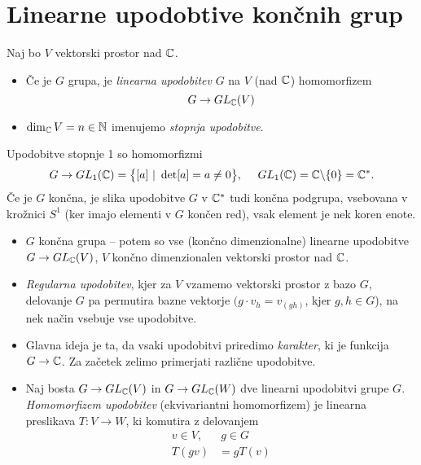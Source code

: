 \section{Linearne upodobtive kon\v cnih grup}

\begin{defin}
	Naj bo $V$ vektorski prostor nad $\mathbb{C}$.
	\begin{itemize}
		\item{\v Ce je $G$ grupa, je {\em linearna upodobitev} $G$ na $V$ (nad $\mathbb{C}$) homomorfizem
			\[
				G \to GL_{\mathbb{C}}(V)
			\]}
		\item{$\dim_{\mathbb{C}} V = n \in \mathbb{N}$ imenujemo {\em stopnja upodobitve}.}
	\end{itemize}
\end{defin}

\begin{zgled} Upodobitve stopnje 1 so homomorfizmi
\[
	G \to GL_1(\mathbb{C}) = \big\{[a]\ |\ \det[a] = a \neq 0\big\},\ \quad GL_1(\mathbb{C}) = \mathbb{C}\backslash\{0\} = \mathbb{C}^*.
\]
\ni \v Ce je $G$ kon\v cna, je slika upodobitve $G$ v $\mathbb{C}^*$ tudi kon\v cna podgrupa, vsebovana v kro\v znici $S^1$ (ker imajo
elementi v $G$ kon\v cen red), vsak element je nek koren enote.
\end{zgled}

\begin{itemize}
	\item{$G$ kon\v cna grupa -- potem so vse (kon\v cno dimenzionalne) linearne upodobitve $G \to GL_{\mathbb{C}} (V)$, $V$ kon\v cno
		dimenzionalen vektorski prostor nad $\mathbb{C}$.}
	\item{\emph{Regularna upodobitev}, kjer za $V$ vzamemo vektorski prostor z bazo $G$, delovanje $G$ pa permutira bazne vektorje
		$(g\cdot v_h = v_{(gh)}$, kjer $g,h \in G$), na nek na\v cin vsebuje vse upodobitve.}
	\item{Glavna ideja je ta, da vsaki upodobitvi priredimo \emph{karakter}, ki je funkcija $G \to \mathbb{C}$. Za za\v cetek zelimo
		primerjati razli\v cne upodobitve.}
	\item{Naj bosta $G \to GL_{\mathbb{C}}(V)$ in $G \to GL_{\mathbb{C}}(W)$ dve linearni upodobitvi grupe $G$. {\em Homomorfizem
		upodobitev} (ekvivariantni homomorfizem) je linearna preslikava $T:V \to W$, ki komutira z delovanjem
		\begin{align*}
			v \in V,\ &\ g \in G \\
			T(gv) &= gT(v)
		\end{align*}}
\end{itemize}

